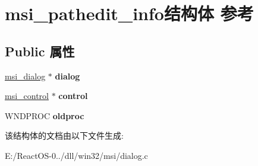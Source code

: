 \hypertarget{structmsi__pathedit__info}{}\section{msi\+\_\+pathedit\+\_\+info结构体 参考}
\label{structmsi__pathedit__info}
\subsection*{Public 属性}
\begin{DoxyCompactItemize}
\item 
\mbox{\label{structmsi__pathedit__info_aa837ce7592bdac0888d7ba11df796677}} 
\hyperlink{structmsi__dialog__tag}{msi\+\_\+dialog} $\ast$ {\bfseries dialog}
\item 
\mbox{\label{structmsi__pathedit__info_af3f31cd394c3a9449166eedc3102a11b}} 
\hyperlink{structmsi__control__tag}{msi\+\_\+control} $\ast$ {\bfseries control}
\item 
\mbox{\label{structmsi__pathedit__info_ab37466f762cf795f159d750242299205}} 
W\+N\+D\+P\+R\+OC {\bfseries oldproc}
\end{DoxyCompactItemize}


该结构体的文档由以下文件生成\+:\begin{DoxyCompactItemize}
\item 
E\+:/\+React\+O\+S-\/0../dll/win32/msi/dialog.\+c\end{DoxyCompactItemize}
